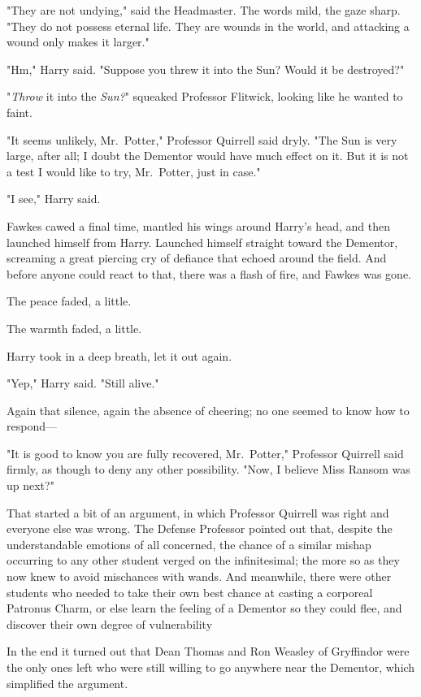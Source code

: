 "They are not undying," said the Headmaster. The words mild, the gaze sharp.
"They do not possess eternal life. They are wounds in the world, and attacking
a wound only makes it larger."

"Hm," Harry said. "Suppose you threw it into the Sun? Would it be destroyed?"

"\emph{Throw} it into the \emph{Sun?}" squeaked Professor Flitwick, looking
like he wanted to faint.

"It seems unlikely, Mr.~Potter," Professor Quirrell said dryly. "The Sun is
very large, after all; I doubt the Dementor would have much effect on it. But
it is not a test I would like to try, Mr.~Potter, just in case."

"I see," Harry said.

Fawkes cawed a final time, mantled his wings around Harry's head, and then
launched himself from Harry. Launched himself straight toward the Dementor,
screaming a great piercing cry of defiance that echoed around the field. And
before anyone could react to that, there was a flash of fire, and Fawkes was
gone.

The peace faded, a little.

The warmth faded, a little.

Harry took in a deep breath, let it out again.

"Yep," Harry said. "Still alive."

Again that silence, again the absence of cheering; no one seemed to know how to
respond---

"It is good to know you are fully recovered, Mr.~Potter," Professor Quirrell
said firmly, as though to deny any other possibility. "Now, I believe Miss
Ransom was up next?"

That started a bit of an argument, in which Professor Quirrell was right and
everyone else was wrong. The Defense Professor pointed out that, despite the
understandable emotions of all concerned, the chance of a similar mishap
occurring to any other student verged on the infinitesimal; the more so as they
now knew to avoid mischances with wands. And meanwhile, there were other
students who needed to take their own best chance at casting a corporeal
Patronus Charm, or else learn the feeling of a Dementor so they could flee, and
discover their own degree of vulnerability{\el}

In the end it turned out that Dean Thomas and Ron Weasley of Gryffindor were
the only ones left who were still willing to go anywhere near the Dementor,
which simplified the argument.

